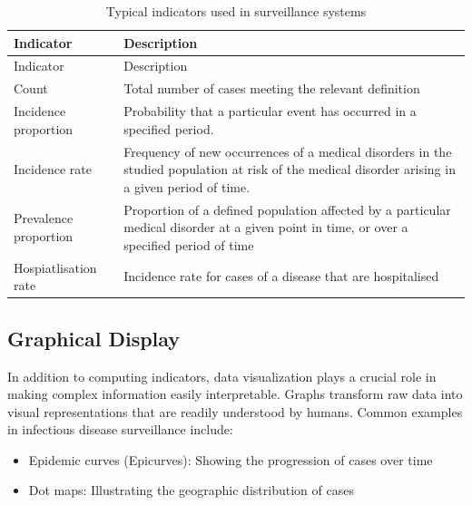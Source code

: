 \documentclass[
  letterpaper,
  DIV=11,
  numbers=noendperiod]{scrreprt}
\providecommand{\tightlist}{%
  \setlength{\itemsep}{0pt}\setlength{\parskip}{0pt}}\usepackage{longtable,booktabs,array}
\begin{document}
\begin{longtable}[]{@{}
  >{\raggedright\arraybackslash}p{}
  >{\raggedright\arraybackslash}p{}@{}}
\caption{Typical indicators used in surveillance systems}\tabularnewline
\toprule\noalign{}
\begin{minipage}[b]{\linewidth}\raggedright
Indicator
\end{minipage} & \begin{minipage}[b]{\linewidth}\raggedright
Description
\end{minipage} \\
\midrule\noalign{}
\endfirsthead
\toprule\noalign{}
\begin{minipage}[b]{\linewidth}\raggedright
Indicator
\end{minipage} & \begin{minipage}[b]{\linewidth}\raggedright
Description
\end{minipage} \\
\midrule\noalign{}
\endhead
\bottomrule\noalign{}
\endlastfoot
Count & Total number of cases meeting the relevant definition \\
Incidence proportion & Probability that a particular event has occurred
in a specified period. \\
Incidence rate & Frequency of new occurrences of a medical disorders in
the studied population at risk of the medical disorder arising in a
given period of time. \\
Prevalence proportion & Proportion of a defined population affected by a
particular medical disorder at a given point in time, or over a
specified period of time \\
Hospiatlisation rate & Incidence rate for cases of a disease that are
hospitalised \\
\end{longtable}

\subsection{Graphical Display}\label{graphical-display}

In addition to computing indicators, data visualization plays a crucial
role in making complex information easily interpretable. Graphs
transform raw data into visual representations that are readily
understood by humans. Common examples in infectious disease surveillance
include:

\begin{itemize}
\tightlist
\item
  Epidemic curves (Epicurves): Showing the progression of cases over
  time
\item
  Dot maps: Illustrating the geographic distribution of cases
\end{itemize}
\end{document}
